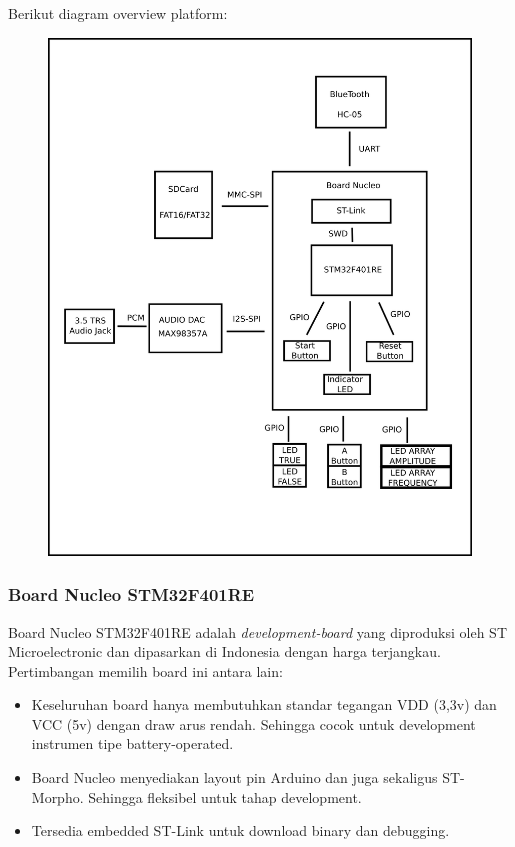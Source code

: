 \documentclass[12pt,]{article}
\begin{document}
	Berikut diagram overview platform:
	
	\begin{figure}[!ht]
		\centering
		\includegraphics[width=400pt]{images/overview}
	\end{figure}
	
	\newpage
	\subsubsection{Board Nucleo STM32F401RE}
	
	Board Nucleo STM32F401RE adalah \textit{development-board} yang diproduksi oleh ST Microelectronic
	dan dipasarkan di Indonesia dengan harga terjangkau.
	Pertimbangan memilih board ini antara lain:
	\begin{itemize}
		\item Keseluruhan board hanya membutuhkan standar tegangan VDD (3,3v) dan VCC (5v) dengan draw arus rendah.
		Sehingga cocok untuk development instrumen tipe battery-operated.
		
		\item Board Nucleo menyediakan layout pin Arduino dan juga sekaligus ST-Morpho.
		Sehingga fleksibel untuk tahap development.
	
		\item Tersedia embedded ST-Link untuk download binary dan debugging.
	\end{itemize}
\end{document}
